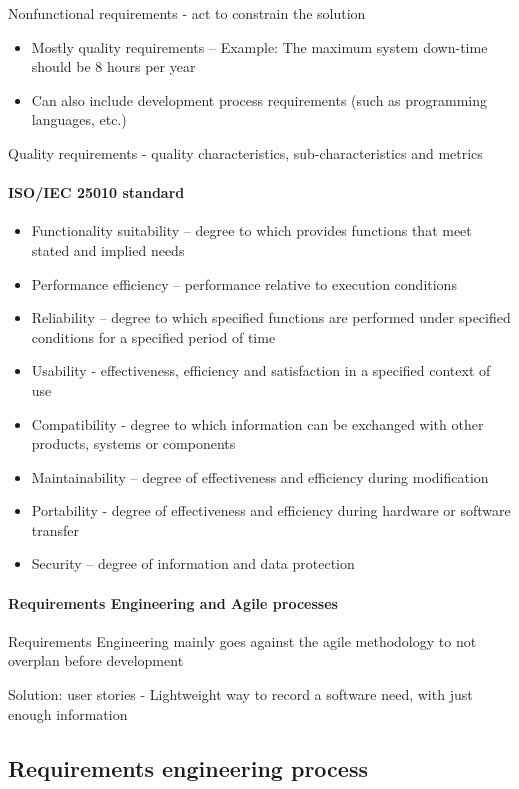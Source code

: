 \documentclass[../ESOF_notes.tex]{subfiles}
\begin{document}
Nonfunctional requirements - act to constrain the solution
\begin{itemize}
    \item Mostly quality requirements – Example: The maximum system down-time should be 8 hours per year
    \item Can also include development process requirements (such as programming languages, etc.)
\end{itemize}

Quality requirements - quality characteristics, sub-characteristics and metrics

\paragraph{ISO/IEC 25010 standard}
    \begin{itemize}
        \item Functionality suitability – degree to which provides functions that meet stated and implied needs
        \item Performance efficiency – performance relative to execution conditions
        \item Reliability – degree to which specified functions are performed under specified conditions for a specified period of time
        \item Usability - effectiveness, efficiency and satisfaction in a specified context of use
        \item Compatibility - degree to which information can be exchanged with other products, systems or components
        \item Maintainability – degree of effectiveness and efficiency during modification
        \item Portability - degree of effectiveness and efficiency during hardware or software transfer
        \item Security – degree of information and data protection
    \end{itemize}

\paragraph{Requirements Engineering and Agile processes}
Requirements Engineering mainly goes against the agile methodology to not overplan before development

Solution: user stories - Lightweight way to record a software need, with just enough information

\subsection{Requirements engineering process}
\end{document}
